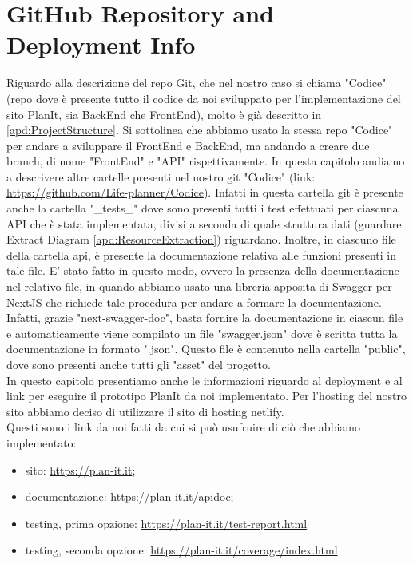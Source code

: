 \section{GitHub Repository and Deployment Info}
\label{secD4:GitHubRepositoryAndDeploymentInfo}
Riguardo alla descrizione del repo Git, che nel nostro caso si chiama "Codice" (repo dove è presente tutto il codice da noi sviluppato per l'implementazione del sito PlanIt, sia BackEnd che FrontEnd), molto è già descritto in \ref{apd:ProjectStructure}. Si sottolinea che abbiamo usato la stessa repo "Codice" per andare a sviluppare il FrontEnd e BackEnd, ma andando a creare due branch, di nome "FrontEnd" e "API" rispettivamente. In questa capitolo andiamo a descrivere altre cartelle presenti nel nostro git "Codice" (link: \href{https://github.com/Life-planner/Codice} {https://github.com/Life-planner/Codice}). Infatti in questa cartella git è presente anche la cartella "\_tests\_" dove sono presenti tutti i test effettuati per ciascuna API che è stata implementata, divisi a seconda di quale struttura dati (guardare Extract Diagram \ref{apd:ResourceExtraction}) riguardano. Inoltre, in  ciascuno file della cartella api, è presente la documentazione relativa alle funzioni presenti in tale file. E' stato fatto in questo modo, ovvero la presenza della documentazione nel relativo file, in quando abbiamo usato una libreria apposita di Swagger per NextJS che richiede tale procedura per andare a formare la documentazione. Infatti, grazie "next-swagger-doc", basta fornire la documentazione in ciascun file e automaticamente viene compilato un file "swagger.json" dove è scritta tutta la documentazione in formato ".json". Questo file è contenuto nella cartella "public", dove sono presenti anche tutti gli "asset" del progetto.\\
In questo capitolo presentiamo anche le informazioni riguardo al deployment e al link per eseguire il prototipo PlanIt da noi implementato. Per l'hosting del nostro sito abbiamo deciso di utilizzare il sito di hosting netlify. \\ Questi sono i link da noi fatti da cui si può usufruire di ciò che abbiamo implementato:
\begin{itemize}
    \item sito: \href{https://plan-it.it} {https://plan-it.it};
    \item documentazione: \href{https://plan-it.it/apidoc} {https://plan-it.it/apidoc};
    \item testing, prima opzione: \href{https://plan-it.it/test-report.html} {https://plan-it.it/test-report.html}
    \item testing, seconda opzione: \href{https://plan-it.it/coverage/index.html} {https://plan-it.it/coverage/index.html}

\end{itemize}
